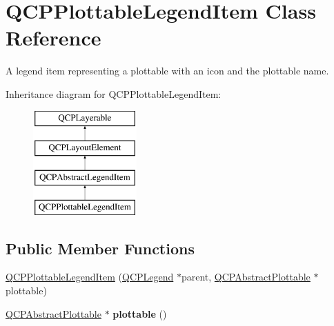 \hypertarget{classQCPPlottableLegendItem}{\section{\-Q\-C\-P\-Plottable\-Legend\-Item \-Class \-Reference}
\label{classQCPPlottableLegendItem}
}


\-A legend item representing a plottable with an icon and the plottable name.  


\-Inheritance diagram for \-Q\-C\-P\-Plottable\-Legend\-Item\-:\begin{figure}[H]
\begin{center}
\leavevmode
\includegraphics[height=4.000000cm]{classQCPPlottableLegendItem}
\end{center}
\end{figure}
\subsection*{\-Public \-Member \-Functions}
\begin{DoxyCompactItemize}
\item 
\hyperlink{classQCPPlottableLegendItem_ac1072591fe409d3dabad51b23ee4d6c5}{\-Q\-C\-P\-Plottable\-Legend\-Item} (\hyperlink{classQCPLegend}{\-Q\-C\-P\-Legend} $\ast$parent, \hyperlink{classQCPAbstractPlottable}{\-Q\-C\-P\-Abstract\-Plottable} $\ast$plottable)
\item 
\hypertarget{classQCPPlottableLegendItem_af29e9a2c60b4cba0cac2447b8af7b488}{\hyperlink{classQCPAbstractPlottable}{\-Q\-C\-P\-Abstract\-Plottable} $\ast$ {\bfseries plottable} ()}\label{classQCPPlottableLegendItem_af29e9a2c60b4cba0cac2447b8af7b488}

\end{DoxyCompactItemize}
